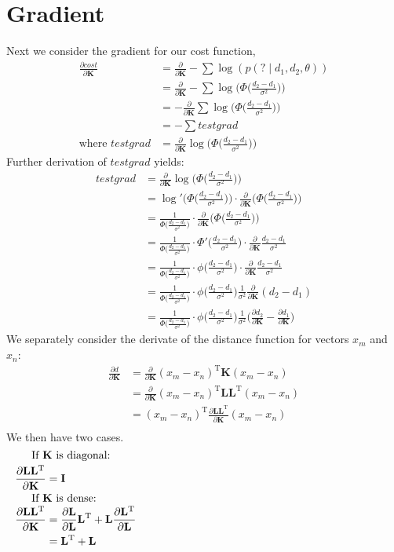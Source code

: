 \documentclass[12pt]{article}
\newcommand\K{\mathbf{K}}
\newcommand\T{\text{T}}
\newcommand\EL{\mathbf{L}}
\begin{document}
\section{Gradient}
Next we consider the gradient for our cost function, 
\begin{align*}
\frac{\partial cost}{\partial \K}
&= \frac{\partial}{\partial \K} -\sum\log(p(? \mid d_1, d_2, \theta))\\
&= \frac{\partial}{\partial \K} -\sum\log\Big(\Phi\Big(\frac{d_2-d_1}{\sigma^2}\Big)\Big)\\
&= -\frac{\partial}{\partial \K} \sum\log\Big(\Phi\Big(\frac{d_2-d_1}{\sigma^2}\Big)\Big)\\
&= -\sum testgrad\\
\text{where } testgrad &= \frac{\partial}{\partial \K}\log\Big(\Phi\Big(\frac{d_2-d_1}{\sigma^2}\Big)\Big)
\end{align*}
Further derivation of $testgrad$ yields:
\begin{align*}
testgrad
&= \frac{\partial}{\partial \K}\log\Big(\Phi\Big(\frac{d_2-d_1}{\sigma^2}\Big)\Big)\\
&= \log'\Big(\Phi\Big(\frac{d_2-d_1}{\sigma^2}\Big)\Big)\cdot \frac{\partial}{\partial \K}\Big(\Phi\Big(\frac{d_2-d_1}{\sigma^2}\Big)\Big)\\
&= \frac{1}{\Phi\Big(\frac{d_2-d_1}{\sigma^2}\Big)}\cdot \frac{\partial}{\partial \K}\Big(\Phi\Big(\frac{d_2-d_1}{\sigma^2}\Big)\Big)\\
&= \frac{1}{\Phi\Big(\frac{d_2-d_1}{\sigma^2}\Big)}\cdot \Phi'\Big(\frac{d_2-d_1}{\sigma^2}\Big)\cdot\frac{\partial}{\partial \K}\frac{d_2-d_1}{\sigma^2}\\
&= \frac{1}{\Phi\Big(\frac{d_2-d_1}{\sigma^2}\Big)}\cdot \phi\Big(\frac{d_2-d_1}{\sigma^2}\Big)\cdot\frac{\partial}{\partial \K}\frac{d_2-d_1}{\sigma^2}\\
&= \frac{1}{\Phi\Big(\frac{d_2-d_1}{\sigma^2}\Big)}\cdot \phi\Big(\frac{d_2-d_1}{\sigma^2}\Big)\frac{1}{{\sigma^2}}\frac{\partial}{\partial \K}(d_2-d_1)\\
&= \frac{1}{\Phi\Big(\frac{d_2-d_1}{\sigma^2}\Big)}\cdot \phi\Big(\frac{d_2-d_1}{\sigma^2}\Big)\frac{1}{{\sigma^2}}\Bigg(\frac{\partial d_2}{\partial \K}-\frac{\partial d_1}{\partial \K}\Bigg)
\end{align*}
We separately consider the derivate of the distance function for vectors $x_m$ and $x_n$:
\begin{align*}
\frac{\partial d}{\partial \K}
&= \frac{\partial}{\partial \K} (x_m-x_n)^\T \K (x_m-x_n)\\
&= \frac{\partial}{\partial \K} (x_m-x_n)^\T \EL\EL^\T (x_m-x_n)\\
&=  (x_m-x_n)^\T \frac{\partial \EL\EL^\T}{\partial \K}(x_m-x_n)\\
\end{align*}
We then have two cases.
\begin{align*}
\noalign{If $\K$ is diagonal:}
\frac{\partial \EL\EL^\T}{\partial \K}
&= \mathbf{I}\\
\noalign{If $\K$ is dense:}
\frac{\partial \EL\EL^\T}{\partial \K}
&= \frac{\partial \EL}{\partial \EL}\EL^\T+\EL\frac{\partial \EL^\T}{\partial \EL}\\
&= \EL^\T+\EL
\end{align*}
\end{document}

